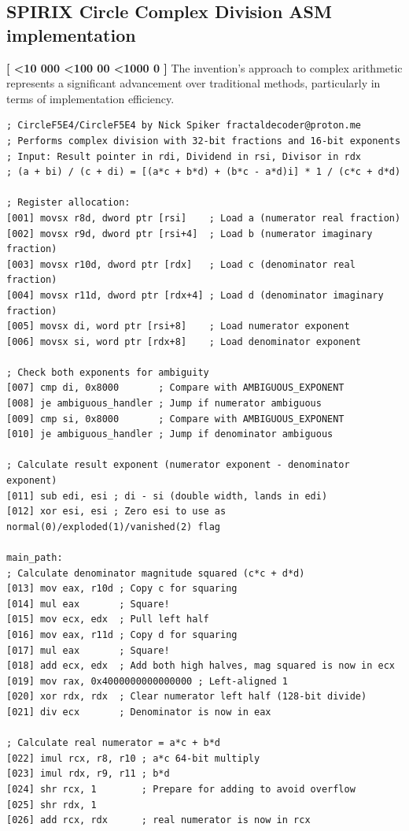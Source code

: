 \documentclass[12pt,letter]{article}
\newcounter{paracounter}
\newcommand{\ppara}[1]{
\noindent\textbf{[\formatparanumber{\arabic{paracounter}}]} \begingroup\RaggedRight\sloppy\hbadness=10000 #1\par\endgroup%
\stepcounter{paracounter}%
}
\newcommand{\formatparanumber}[1]{%
\ifnum#1<10 000%
\else\ifnum#1<100 00%
\else\ifnum#1<1000 0%
\fi\fi\fi#1%
}
\begin{document}
\subsection*{SPIRIX Circle Complex Division ASM implementation}

\ppara{The invention's approach to complex arithmetic represents a significant advancement over traditional methods, particularly in terms of implementation efficiency.}

\begin{lstlisting}[style=rust, caption={Complete Complex Division Assembly Implementation}, label={fig:circle_divide}]
; CircleF5E4/CircleF5E4 by Nick Spiker fractaldecoder@proton.me
; Performs complex division with 32-bit fractions and 16-bit exponents
; Input: Result pointer in rdi, Dividend in rsi, Divisor in rdx
; (a + bi) / (c + di) = [(a*c + b*d) + (b*c - a*d)i] * 1 / (c*c + d*d)

; Register allocation:
[001] movsx r8d, dword ptr [rsi]    ; Load a (numerator real fraction)
[002] movsx r9d, dword ptr [rsi+4]  ; Load b (numerator imaginary fraction)
[003] movsx r10d, dword ptr [rdx]   ; Load c (denominator real fraction)
[004] movsx r11d, dword ptr [rdx+4] ; Load d (denominator imaginary fraction)
[005] movsx di, word ptr [rsi+8]    ; Load numerator exponent
[006] movsx si, word ptr [rdx+8]    ; Load denominator exponent

; Check both exponents for ambiguity
[007] cmp di, 0x8000       ; Compare with AMBIGUOUS_EXPONENT
[008] je ambiguous_handler ; Jump if numerator ambiguous
[009] cmp si, 0x8000       ; Compare with AMBIGUOUS_EXPONENT
[010] je ambiguous_handler ; Jump if denominator ambiguous

; Calculate result exponent (numerator exponent - denominator exponent)
[011] sub edi, esi ; di - si (double width, lands in edi)
[012] xor esi, esi ; Zero esi to use as normal(0)/exploded(1)/vanished(2) flag

main_path:
; Calculate denominator magnitude squared (c*c + d*d)
[013] mov eax, r10d ; Copy c for squaring
[014] mul eax       ; Square!
[015] mov ecx, edx  ; Pull left half
[016] mov eax, r11d ; Copy d for squaring
[017] mul eax       ; Square!
[018] add ecx, edx  ; Add both high halves, mag squared is now in ecx
[019] mov rax, 0x4000000000000000 ; Left-aligned 1
[020] xor rdx, rdx  ; Clear numerator left half (128-bit divide)
[021] div ecx       ; Denominator is now in eax

; Calculate real numerator = a*c + b*d
[022] imul rcx, r8, r10 ; a*c 64-bit multiply
[023] imul rdx, r9, r11 ; b*d
[024] shr rcx, 1        ; Prepare for adding to avoid overflow
[025] shr rdx, 1
[026] add rcx, rdx      ; real numerator is now in rcx


\end{lstlisting}
\end{document}
